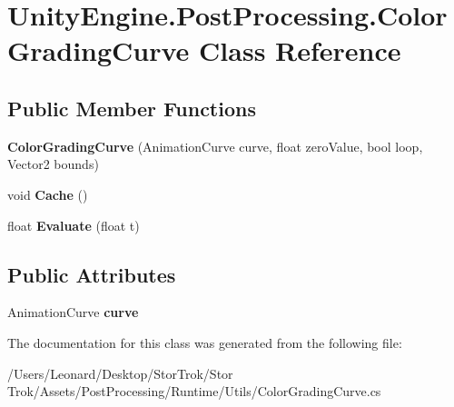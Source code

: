 \hypertarget{class_unity_engine_1_1_post_processing_1_1_color_grading_curve}{}\section{Unity\+Engine.\+Post\+Processing.\+Color\+Grading\+Curve Class Reference}
\label{class_unity_engine_1_1_post_processing_1_1_color_grading_curve}
\subsection*{Public Member Functions}
\begin{DoxyCompactItemize}
\item 
\mbox{\label{class_unity_engine_1_1_post_processing_1_1_color_grading_curve_ac68ca4da61fb2f9b5621f380319f43c3}} 
{\bfseries Color\+Grading\+Curve} (Animation\+Curve curve, float zero\+Value, bool loop, Vector2 bounds)
\item 
\mbox{\label{class_unity_engine_1_1_post_processing_1_1_color_grading_curve_a819bbd63f105f12ed7f341715088bf9b}} 
void {\bfseries Cache} ()
\item 
\mbox{\label{class_unity_engine_1_1_post_processing_1_1_color_grading_curve_af89e9253ac0366e5094cd59edc6933cb}} 
float {\bfseries Evaluate} (float t)
\end{DoxyCompactItemize}
\subsection*{Public Attributes}
\begin{DoxyCompactItemize}
\item 
\mbox{\label{class_unity_engine_1_1_post_processing_1_1_color_grading_curve_a9d614d239251bd42db12ad55b509f316}} 
Animation\+Curve {\bfseries curve}
\end{DoxyCompactItemize}


The documentation for this class was generated from the following file\+:\begin{DoxyCompactItemize}
\item 
/\+Users/\+Leonard/\+Desktop/\+Stor\+Trok/\+Stor Trok/\+Assets/\+Post\+Processing/\+Runtime/\+Utils/Color\+Grading\+Curve.\+cs\end{DoxyCompactItemize}
